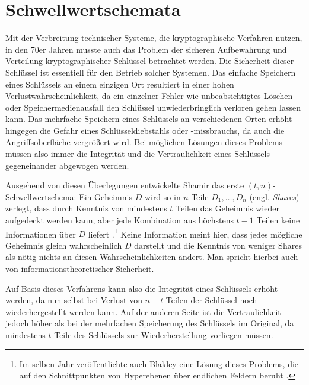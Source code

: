 \section{Schwellwertschemata}

\label{sec_basics_threshold}


Mit der Verbreitung technischer Systeme, die kryptographische Verfahren nutzen, in den 70er Jahren musste auch das Problem der sicheren Aufbewahrung und Verteilung kryptographischer Schlüssel betrachtet werden. Die Sicherheit dieser Schlüssel ist essentiell für den Betrieb solcher Systemen. Das einfache Speichern eines Schlüssels an einem einzigen Ort resultiert in einer hohen Verlustwahrscheinlichkeit, da ein einzelner Fehler wie unbeabsichtigtes Löschen oder Speichermedienausfall den Schlüssel unwiederbringlich verloren gehen lassen kann. Das mehrfache Speichern eines Schlüssels an verschiedenen Orten erhöht hingegen die Gefahr eines Schlüsseldiebstahls oder -missbrauchs, da auch die Angriffsoberfläche vergrößert wird. Bei möglichen Lösungen dieses Problems müssen also immer die Integrität und die Vertraulichkeit eines Schlüssels gegeneinander abgewogen werden. \cite{gemmell1997}

Ausgehend von diesen Überlegungen entwickelte Shamir das erste \((t,n)\)-Schwellwertschema: Ein Geheimnis \(D\) wird so in \(n\) Teile \(D_1, \dots, D_n\) (engl. \textit{Shares}) zerlegt, dass durch Kenntnis von mindestens \(t\) Teilen das Geheimnis wieder aufgedeckt werden kann, aber jede Kombination aus höchstens \(t-1\) Teilen keine Informationen über \(D\) liefert \cite{shamir1979}.\footnote{
  Im selben Jahr veröffentlichte auch Blakley eine Lösung dieses Problems, die auf den Schnittpunkten von Hyperebenen über endlichen Feldern beruht \cite{blakley1979}.
} Keine Information meint hier, dass jedes mögliche Geheimnis gleich wahrscheinlich \(D\) darstellt und die Kenntnis von weniger Shares als nötig nichts an diesen Wahrscheinlichkeiten ändert. Man spricht hierbei auch von informationstheoretischer Sicherheit.

Auf Basis dieses Verfahrens kann also die Integrität eines Schlüssels erhöht werden, da nun selbst bei Verlust von \(n-t\) Teilen der Schlüssel noch wiederhergestellt werden kann. Auf der anderen Seite ist die Vertraulichkeit jedoch höher als bei der mehrfachen Speicherung des Schlüssels im Original, da mindestens \(t\) Teile des Schlüssels zur Wiederherstellung vorliegen müssen.


